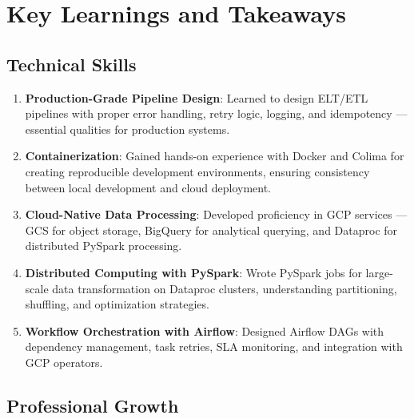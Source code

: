 \documentclass[12pt, a4paper]{article}
\begin{document}
\section{Key Learnings and Takeaways}
\label{sec:learnings}

\subsection{Technical Skills}

\begin{enumerate}
    \item \textbf{Production-Grade Pipeline Design}: Learned to design ELT/ETL pipelines with proper error handling, retry logic, logging, and idempotency --- essential qualities for production systems.
    
    \item \textbf{Containerization}: Gained hands-on experience with Docker and Colima for creating reproducible development environments, ensuring consistency between local development and cloud deployment.
    
    \item \textbf{Cloud-Native Data Processing}: Developed proficiency in GCP services --- GCS for object storage, BigQuery for analytical querying, and Dataproc for distributed PySpark processing.
    
    \item \textbf{Distributed Computing with PySpark}: Wrote PySpark jobs for large-scale data transformation on Dataproc clusters, understanding partitioning, shuffling, and optimization strategies.
    
    \item \textbf{Workflow Orchestration with Airflow}: Designed Airflow DAGs with dependency management, task retries, SLA monitoring, and integration with GCP operators.
\end{enumerate}

\subsection{Professional Growth}
\end{document}
